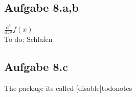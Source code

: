 \documentclass[11pt,
               a4paper,
               parskip=half,
               ]{scrartcl}
\newcommand {\nd }[2]{\frac {\mathrm {d}^#1 }{\mathrm {d} #2^#1}}
\newcommand {\ToDo }[1]{{\color{red}To do: #1}}
\begin{document}
\newpage

\subsection{Aufgabe 8.a,b}

$\nd{3}{x}f(x)$ \\
 \ToDo{Schlafen}

\subsection{Aufgabe 8.c}

The package its called [disable]{todonotes}

\newpage
{}
\printbibliography

\begin{appendix} 

\end{appendix}

\clearpage
\end{document}
